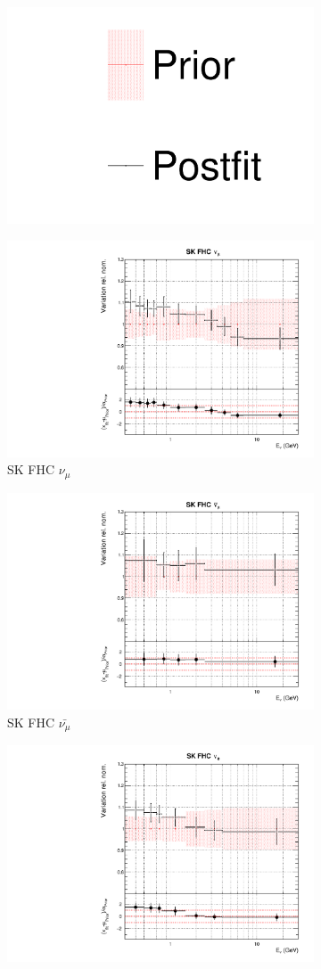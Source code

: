 \begin{figure}
\centering
\begin{subfigure}{0.8\textwidth}
  \centering
  \includegraphics[width=0.24\linewidth]{figs/dat_leg}
\end{subfigure}
\begin{subfigure}{0.45\textwidth}
  \centering
  \includegraphics[width=0.75\linewidth]{figs/datflux8}
  \caption{SK FHC $\nu_{\mu}$}
\end{subfigure}
\begin{subfigure}{0.45\textwidth}
  \centering
  \includegraphics[width=0.75\linewidth]{figs/datflux9}
  \caption{SK FHC $\bar{\nu_{\mu}}$}
\end{subfigure}
\begin{subfigure}{0.45\textwidth}
  \centering
  \includegraphics[width=0.75\linewidth]{figs/datflux10}

\end{subfigure}
\end{figure}
